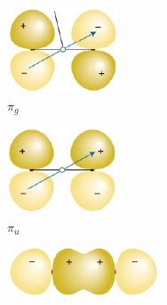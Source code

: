 \documentclass[10pt,a4paper,twocolumn]{article} %
\numberwithin{equation}{section} %
\begin{document}
\begin{itemize}
\begin{itemize}
\begin{minipage}[c]{0.3\linewidth}
			\includegraphics[width=0.9\linewidth]{pig.jpg}\\
			$\pi_g$
		\end{minipage}%
		\begin{minipage}[c]{0.3\linewidth}
			\centering
			\includegraphics[width=0.9\linewidth]{piu.jpg}\\
			$\pi_u$
		\end{minipage}%
		\begin{minipage}[c]{0.4\linewidth}
			\centering
			\includegraphics[width=0.9\linewidth]{sigmag.jpg}\\

\end{minipage}
\end{itemize}
\end{itemize}
\end{document}
